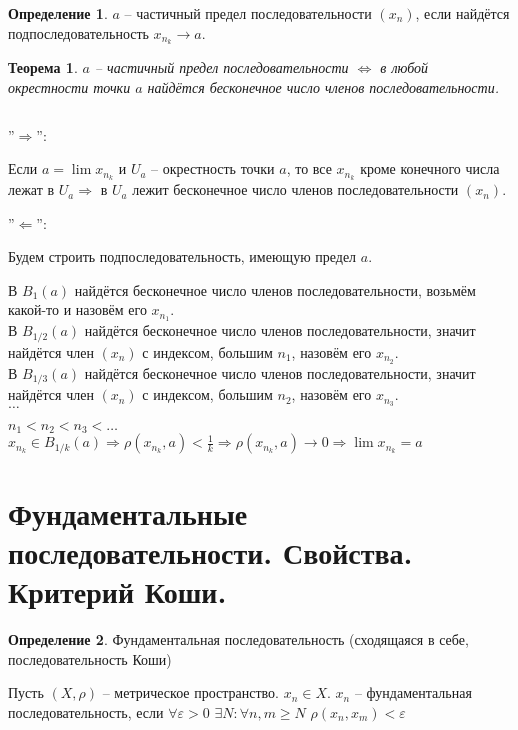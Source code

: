 \documentclass[12pt,letterpaper]{report}
\makeatletter
\newtheorem*{theorem-non}{Теорема}
\theoremstyle{definition}
\newtheorem*{conj}{Определение}
\renewenvironment{proof}[1][\proofname]{%
   \par\pushQED{\qed}\normalfont%
   \topsep6\p@\@plus6\p@\relax
   \trivlist\item[\hskip\labelsep\bfseries#1\@addpunct{.}]%
   \ignorespaces
}{%
   \popQED\endtrivlist\@endpefalse
}
\makeatother
\begin{document}
    \begin{conj}
    $a$ -- частичный предел последовательности $(x_n)$, если найдётся
    подпоследовательность $x_{n_k} \rightarrow a$.
    \end{conj}
    \begin{theorem-non}
    $a$ -- частичный предел последовательности $\Leftrightarrow$
    в любой окрестности точки $a$ найдётся бесконечное число членов
    последовательности.
    \end{theorem-non}
    \begin{proof} $ $
    
        ''$\Longrightarrow$'':
    
        Если $a = \lim x_{n_k}$ и $U_a$ -- окрестность точки $a$, то
        все $x_{n_k}$ кроме конечного числа лежат в $U_a \Rightarrow$
        в $U_a$ лежит бесконечное число членов последовательности $(x_n)$.
    
        ''$\Longleftarrow$'':
    
        Будем строить подпоследовательность, имеющую предел $a$.
    
        В $B_{1}(a)$ найдётся бесконечное число членов последовательности,
        возьмём какой-то и назовём его $x_{n_1}$.\\
        В $B_{1/2}(a)$ найдётся бесконечное число членов
        последовательности, значит найдётся член $(x_n)$ с индексом, большим
        $n_1$, назовём его $x_{n_2}$.\\
        В $B_{1/3}(a)$ найдётся бесконечное число членов
        последовательности, значит найдётся член $(x_n)$ с индексом, большим
        $n_2$, назовём его $x_{n_3}$.\\
        $\dots$
    
        $n_1 < n_2 < n_3 < \dots$\\
        $x_{n_k} \in B_{1/k}(a) \Rightarrow \rho(x_{n_k}, a) < \frac1k
        \Rightarrow \rho(x_{n_k}, a) \rightarrow 0 \Rightarrow
        \lim x_{n_k} = a$
    
    \end{proof}
    
    \section{Фундаментальные последовательности. Свойства. Критерий Коши.}
    
    \begin{conj}
    Фундаментальная последовательность (сходящаяся в себе,
    последовательность Коши)
    \end{conj}
    Пусть $(X, \rho)$ -- метрическое пространство. $x_n \in X$.
    $x_n$ -- фундаментальная последовательность, если $\forall
    \varepsilon > 0 \,\, \exists N : \forall n, m \geq N \,\,
    \rho(x_n, x_m) < \varepsilon$
    
\end{document}
